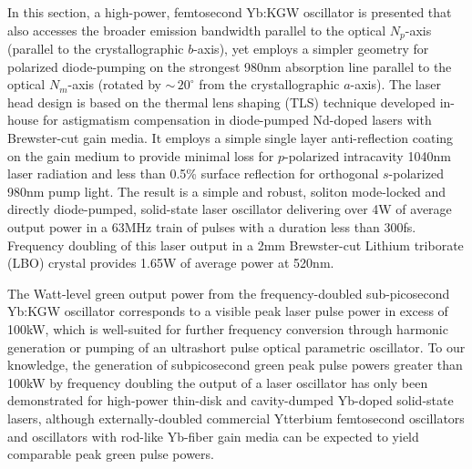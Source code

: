 In this section, a high-power, femtosecond Yb:KGW oscillator is presented that also accesses the broader emission bandwidth parallel to the optical $N_p$-axis (parallel to the crystallographic $b$-axis), yet employs a simpler geometry for polarized diode-pumping on the strongest 980nm absorption line parallel to the optical $N_m$-axis (rotated by $\sim\,20^\circ$ from the crystallographic $a$-axis\cite{Biswal_thermo_optical_05,mochalov_laser_1997,pujol_crystalline_1999}).
The laser head design is based on the thermal lens shaping (TLS) technique developed in-house for astigmatism compensation in diode-pumped Nd-doped lasers with Brewster-cut gain media\cite{Rimington_thermal_lens_2004}.
It employs a simple single layer  anti-reflection coating on the gain medium to provide minimal loss for $p$-polarized intracavity 1040nm laser radiation and less than 0.5\% surface reflection for orthogonal $s$-polarized 980nm pump light.
The result is a simple and robust, soliton mode-locked and directly diode-pumped, solid-state laser oscillator delivering over 4W of average output power in a 63MHz train of pulses with a duration less than 300fs.
Frequency doubling of this laser output in a 2mm Brewster-cut Lithium triborate (LBO) crystal provides 1.65W of average power at 520nm.

The Watt-level green output power from the frequency-doubled sub-picosecond Yb:KGW oscillator corresponds to a visible peak laser pulse power in excess of 100kW, which is well-suited for further frequency conversion through harmonic generation or pumping of an ultrashort pulse optical parametric oscillator.
To our knowledge, the generation of subpicosecond green peak pulse powers greater than 100kW by frequency doubling the output of a laser oscillator has only been demonstrated for high-power thin-disk\cite{Brunner_powerful_2004,Marchese_pulse_energy_06} and cavity-dumped\cite{Palmer_microjoule_07} Yb-doped solid-state lasers, although externally-doubled commercial Ytterbium femtosecond oscillators\cite{website_amplitude,website_solar,website_high_q,website_time_bandwidth} and oscillators with rod-like Yb-fiber gain media\cite{Ortac_pulse_2007} can be expected to yield comparable peak green pulse powers.

